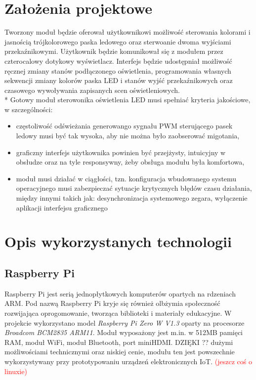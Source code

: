 \documentclass[12pt, eng, twoside, openany, final]{mgr}
\begin{document}
\chapter{Założenia projektowe}
\thispagestyle{fancy}  
    Tworzony moduł będzie oferował użytkownikowi możliwość sterowania kolorami i jasnością trójkolorowego paska ledowego oraz sterwoanie dwoma wyjściami przekaźnikowymi. Użytkownik będzie komunikował się z modułem przez czterocalowy dotykowy wyświetlacz. Interfejs będzie udostępniał możliwość ręcznej zmiany stanów podłączonego oświetlenia, programowania własnych sekwencji zmiany kolorów paska LED i stanów wyjść przekaźnikowych oraz czasowego wywoływania zapisanych scen oświetleniowych.\\*
    Gotowy moduł sterowonika oświetlenia LED musi spełniać kryteria jakościowe, w szczególności:
    \begin{itemize}
        \item częstoliwość odświeżania generowango sygnału PWM sterującego pasek ledowy musi być tak wysoka, aby nie można było zaobserować migotania,
        
        \item graficzny interfejs użytkownika powinien być przejżysty, intuicyjny w obsłudze oraz na tyle responsywny, żeby
        obsługa modułu była komfortowa,
        
        \item moduł musi działać w ciągłości, tzn. konfiguracja wbudowanego systemu operacyjnego musi zabezpieczać sytuacje
        krytycznych błędów czasu działania, między innymi takich jak: desynchronizacja systemowego zegara, wyłączenie aplikacji interfejsu graficznego
    \end{itemize}
%
\chapter{Opis wykorzystanych technologii}
\thispagestyle{fancy}
    \section{Raspberry Pi}
    Raspberry Pi jest serią jednopłytkowych komputerów opartych na rdzeniach ARM. Pod nazwą Raspberry Pi kryje się również olbżymia społeczność rozwijająca oprogomowanie, tworząca biblioteki i materiały edukacyjne.
    W projekcie wykorzystano model \emph{Raspberry Pi Zero W V1.3} oparty na procesorze  \emph{Broadcom BCM2835 ARM11}. Moduł wyposażony jest m.in. w 512MB pamięci RAM, moduł WiFi, moduł Bluetooth, port miniHDMI. DZIĘKI ?? dużymi możliwościami technicznymi oraz niskiej cenie, modułu ten jest powszechnie wykorzystywany przy prototypowaniu urządzeń elektronicznych IoT.
    \textcolor{red}{(jeszcz coś o linuxie)}
\end{document}
